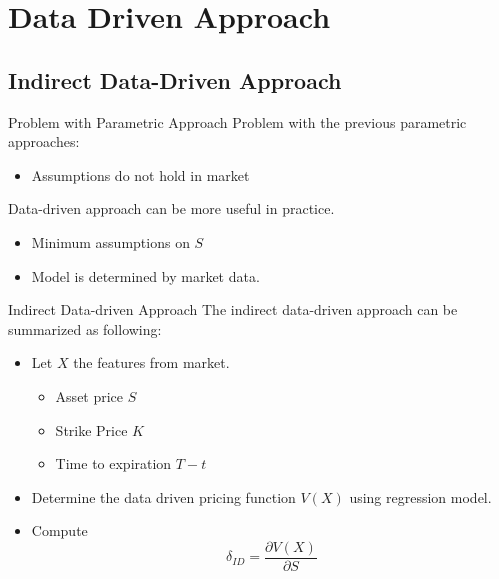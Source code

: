 \documentclass[10pt,table,mathserif]{beamer}
\begin{document}
\section{Data Driven Approach}
\subsection{Indirect Data-Driven Approach}
\begin{frame}{Problem with Parametric Approach}
Problem with the  previous parametric approaches:
\begin{itemize}
  \item Assumptions do not hold in market
\end{itemize}

Data-driven approach can be more useful in practice.
\begin{itemize}
  \item Minimum assumptions on $S$
  \item Model is determined by market data.
\end{itemize}


\end{frame}


\begin{frame}{Indirect Data-driven Approach}
The indirect data-driven approach \footnotemark can be summarized as following:
\begin{itemize}
\item Let $X$ the features from market.
\begin{itemize}
  \item Asset price $S$
  \item Strike Price $K$
  \item Time to expiration $T-t$
\end{itemize}
\item Determine the data driven pricing function $V(X)$ using regression model.
\item Compute
\[
\delta_{ID}=\frac{ \partial V(X) }{ \partial S}
\]
\end{itemize}
\end{frame}
\end{document}
